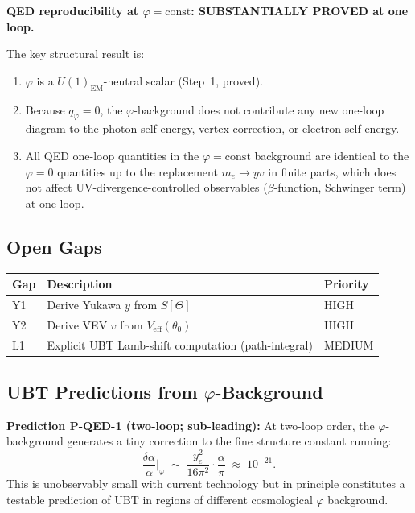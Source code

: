 \documentclass[12pt]{article}
\begin{document}
\textbf{QED reproducibility at $\varphi = \mathrm{const}$: SUBSTANTIALLY PROVED at one loop.}

The key structural result is:
\begin{enumerate}
  \item $\varphi$ is a $U(1)_\mathrm{EM}$-neutral scalar (Step~1, proved).
  \item Because $q_\varphi = 0$, the $\varphi$-background does not contribute any new
        one-loop diagram to the photon self-energy, vertex correction, or electron
        self-energy.
  \item All QED one-loop quantities in the $\varphi = \mathrm{const}$ background are
        identical to the $\varphi = 0$ quantities up to the replacement
        $m_e \to yv$ in finite parts, which does not affect UV-divergence-controlled
        observables ($\beta$-function, Schwinger term) at one loop.
\end{enumerate}

\subsection{Open Gaps}

\begin{center}
\begin{tabular}{lll}
\toprule
\textbf{Gap} & \textbf{Description} & \textbf{Priority} \\
\midrule
Y1 & Derive Yukawa $y$ from $S[\Theta]$ & HIGH \\
Y2 & Derive VEV $v$ from $V_\mathrm{eff}(\theta_0)$ & HIGH \\
L1 & Explicit UBT Lamb-shift computation (path-integral) & MEDIUM \\
\bottomrule
\end{tabular}
\end{center}

\subsection{UBT Predictions from $\varphi$-Background}

\begin{predbox}
\textbf{Prediction P-QED-1 (two-loop; sub-leading):}
At two-loop order, the $\varphi$-background generates a tiny correction to the
fine structure constant running:
\[
  \frac{\delta\alpha}{\alpha}\bigg|_\varphi
  \;\sim\; \frac{y_e^2}{16\pi^2}\cdot\frac{\alpha}{\pi}
  \;\approx\; 10^{-21}.
\]
This is unobservably small with current technology but in principle constitutes a
testable prediction of UBT in regions of different cosmological $\varphi$ background.
\end{predbox}
\end{document}
